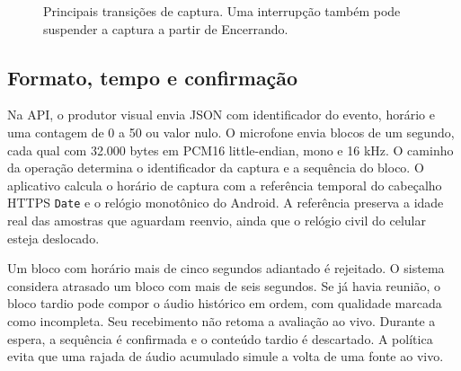 \documentclass[12pt]{article}
\begin{document}
\begin{figure}[htbp]
\centering
{}
\caption{Principais transições de captura. Uma interrupção também pode suspender a captura a partir de Encerrando.}
\label{fig:estados}
\end{figure}

\subsection{Formato, tempo e confirmação}

Na API, o produtor visual envia JSON com identificador do evento, horário e uma contagem de 0 a 50 ou valor nulo. O microfone envia blocos de um segundo, cada qual com 32.000 bytes em PCM16 little-endian, mono e 16 kHz. O caminho da operação determina o identificador da captura e a sequência do bloco. O aplicativo calcula o horário de captura com a referência temporal do cabeçalho HTTPS \texttt{Date} e o relógio monotônico do Android. A referência preserva a idade real das amostras que aguardam reenvio, ainda que o relógio civil do celular esteja deslocado.

Um bloco com horário mais de cinco segundos adiantado é rejeitado. O sistema considera atrasado um bloco com mais de seis segundos. Se já havia reunião, o bloco tardio pode compor o áudio histórico em ordem, com qualidade marcada como incompleta. Seu recebimento não retoma a avaliação ao vivo. Durante a espera, a sequência é confirmada e o conteúdo tardio é descartado. A política evita que uma rajada de áudio acumulado simule a volta de uma fonte ao vivo.
\end{document}
